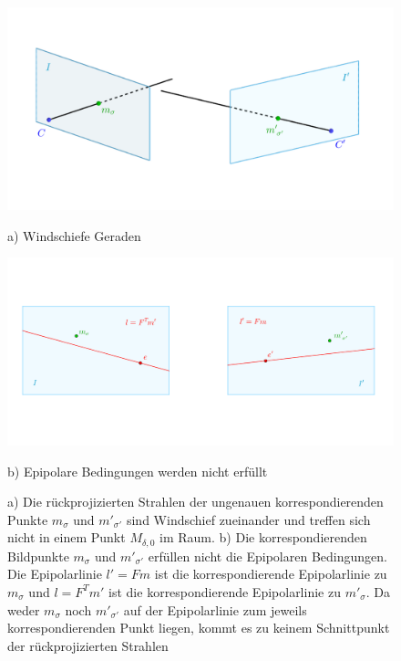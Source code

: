 \begin{figure}[!htb]
	\includegraphics[width=\linewidth]{images/problemTriangulation_beschriftet.png}
	\caption[Windschiefe Geraden]{a) Windschiefe Geraden}
	\label{fig:ProblemTraingulation}
	\endminipage\hfill
	\includegraphics[width=\linewidth]{images/SampsAppx.png}
	\caption[Epipolare Bedingung wird nicht erfüllt]{b) Epipolare Bedingungen werden nicht erfüllt}
	\label{fig:lFm}
	\endminipage\hfill
	\caption[Problemstellung für die Triangulation im reellen Beispiel]{ a) Die rückprojizierten Strahlen der ungenauen korrespondierenden Punkte $m_\sigma$ und $m'_{\sigma'}$ sind Windschief zueinander und treffen sich nicht in einem Punkt $M_{\delta,0}$ im Raum. b) Die korrespondierenden Bildpunkte $m_\sigma$ und $m'_{\sigma'}$ erfüllen nicht die Epipolaren Bedingungen. Die Epipolarlinie $l' = Fm$ ist die korrespondierende Epipolarlinie zu $m_\sigma$ und $l = F^Tm'$ ist die korrespondierende Epipolarlinie zu $m'_{\sigma}$. Da weder $m_\sigma$ noch $m'_{\sigma'}$ auf der Epipolarlinie zum jeweils korrespondierenden Punkt liegen, kommt es zu keinem Schnittpunkt der rückprojizierten Strahlen}
\end{figure}

